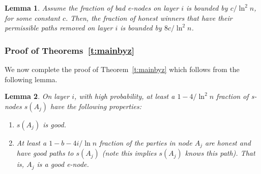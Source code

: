 \documentclass[11pt,letter]{article}
\theoremstyle{mytheoremstyle}
\newtheorem{lemma}{Lemma}
\begin{document}
\begin{lemma}
	\label{l:win too often} Assume the fraction of bad \textsf{e-node}s on layer $i$ is bounded by $c/\ln^2 n$, for some constant $c$. Then, the fraction of honest winners that have their permissible paths removed on layer $i$ is bounded by $8c/\ln^2 n$.
\end{lemma}

\subsubsection{Proof of Theorems~\ref{t:mainbyz}}

We now complete the proof of Theorem~\ref{t:mainbyz} which follows from the following lemma.

\begin{lemma}
	\label{l:main}
	On layer $i$, with high probability, at least a $1-4/\ln^2 n$ fraction of \textsf{s-node}s $s(A_j)$ have the following properties:
	\begin{enumerate}
		\item $s(A_j)$ is good.

		\item At least a $1-b- 4i /\ln n$ fraction of the parties in node $A_j$ are honest and have good paths to $s(A_j)$ (note this implies $s(A_j)$ knows this path). That is, $A_j$ is a good \textsf{e-node}.
	\end{enumerate}
\end{lemma}
\end{document}
